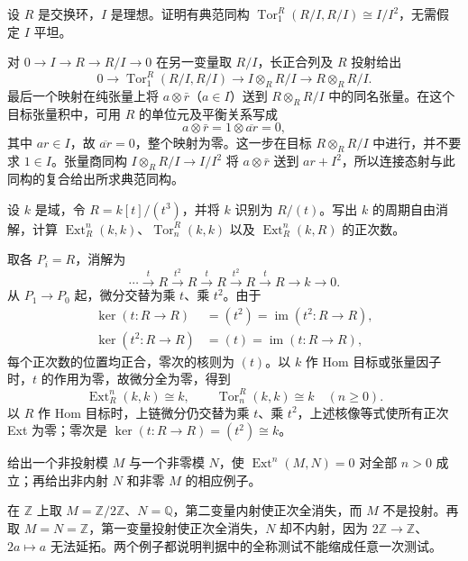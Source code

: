 \begin{exercise}\label{b4:ex:08-tor-conormal}
	设 \(R\) 是交换环，\(I\) 是理想。证明有典范同构 \(\operatorname{Tor}_1^R(R/I,R/I)\cong I/I^2\)，无需假定 \(I\) 平坦。
\end{exercise}
\begin{solution}
	对 \(0\to I\to R\to R/I\to0\) 在另一变量取 \(R/I\)，长正合列及 \(R\) 投射给出
	\[
		0\longrightarrow\operatorname{Tor}_1^R(R/I,R/I) \longrightarrow I\otimes_RR/I\longrightarrow R\otimes_RR/I.
	\]
	最后一个映射在纯张量上将 \(a\otimes\bar r\)（\(a\in I\)）送到 \(R\otimes_RR/I\) 中的同名张量。在这个目标张量积中，可用 \(R\) 的单位元及平衡关系写成
	\[
		a\otimes\bar r=1\otimes\overline{ar}=0,
	\]
	其中 \(ar\in I\)，故 \(\overline{ar}=0\)，整个映射为零。这一步在目标 \(R\otimes_RR/I\) 中进行，并不要求 \(1\in I\)。张量商同构 \(I\otimes_RR/I\to I/I^2\) 将 \(a\otimes\bar r\) 送到 \(ar+I^2\)，所以连接态射与此同构的复合给出所求典范同构。
\end{solution}

\begin{exercise}\label{b4:ex:08-truncated-cubic-ring}
	设 \(k\) 是域，令 \(R=k[t]/(t^3)\)，并将 \(k\) 识别为 \(R/(t)\)。写出 \(k\) 的周期自由消解，计算 \(\operatorname{Ext}_R^n(k,k)\)、\(\operatorname{Tor}_n^R(k,k)\) 以及 \(\operatorname{Ext}_R^n(k,R)\) 的正次数。
\end{exercise}
\begin{solution}
	取各 \(P_i=R\)，消解为
	\[
		\cdots\xrightarrow{t}R\xrightarrow{t^2}R \xrightarrow{t}R\xrightarrow{t^2}R\xrightarrow{t}R \longrightarrow k\longrightarrow0.
	\]
	从 \(P_1\to P_0\) 起，微分交替为乘 \(t\)、乘 \(t^2\)。由于
	\[
		\begin{aligned}
			\ker(t:R\to R)&=(t^2)=\operatorname{im}(t^2:R\to R),\\
			\ker(t^2:R\to R)&=(t)=\operatorname{im}(t:R\to R),
		\end{aligned}
	\]
	每个正次数的位置均正合，零次的核则为 \((t)\)。以 \(k\) 作 Hom 目标或张量因子时，\(t\) 的作用为零，故微分全为零，得到
	\[
		\operatorname{Ext}_R^n(k,k)\cong k,\qquad \operatorname{Tor}_n^R(k,k)\cong k\quad(n\ge0).
	\]
	以 \(R\) 作 Hom 目标时，上链微分仍交替为乘 \(t\)、乘 \(t^2\)，上述核像等式使所有正次 Ext 为零；零次是 \(\ker(t:R\to R)=(t^2)\cong k\)。
\end{solution}

\begin{exercise}\label{b4:ex:08-one-module-test-fails}
	给出一个非投射模 \(M\) 与一个非零模 \(N\)，使 \(\operatorname{Ext}^n(M,N)=0\) 对全部 \(n>0\) 成立；再给出非内射 \(N\) 和非零 \(M\) 的相应例子。
\end{exercise}
\begin{solution}
	在 \(\mathbb Z\) 上取 \(M=\mathbb Z/2\mathbb Z\)、\(N=\mathbb Q\)，第二变量内射使正次全消失，而 \(M\) 不是投射。再取 \(M=N=\mathbb Z\)，第一变量投射使正次全消失，\(N\) 却不内射，因为 \(2\mathbb Z\to\mathbb Z\)、\(2a\mapsto a\) 无法延拓。两个例子都说明判据中的全称测试不能缩成任意一次测试。
\end{solution}

